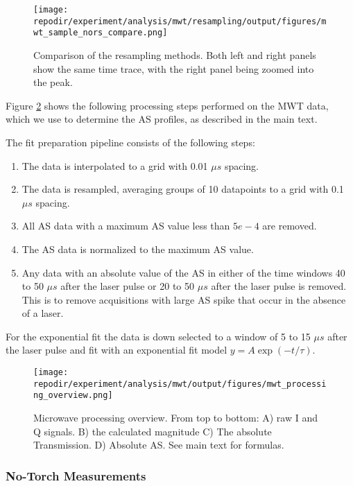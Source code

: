 \begin{figure}
\centering
\texttt{[image: \\repodir/experiment/analysis/mwt/resampling/output/figures/mwt\_sample\_nors\_compare.png]}
\caption{Comparison of the resampling methods. Both left and right panels show the same time trace, with the right panel being zoomed into the peak.}
\label{fig:SI_mwt_resampling}
\end{figure}

Figure \ref{fig:SI_mwt_processing_overview} shows the following processing steps performed on the MWT data, which we use to determine the AS profiles, as described in the main text.

The fit preparation pipeline consists of the following steps:

\begin{enumerate}
    \item The data is interpolated to a grid with 0.01 $\mu s$ spacing.
    \item The data is resampled, averaging groups of 10 datapoints to a grid with 0.1 $\mu s$ spacing. %
    \item All AS data with a maximum AS value less than $5e-4$ are removed.
    \item The AS data is normalized to the maximum AS value.
    \item Any data with an absolute value of the AS in either of the time windows 40 to 50 $\mu s$ after the laser pulse or 20 to 50 $\mu s$ after the laser pulse is removed. This is to remove acquisitions with large AS spike that occur in the absence of a laser.
\end{enumerate}


For the exponential fit the data is down selected to a window of 5 to 15 $\mu s$ after the laser pulse and fit with an exponential fit model $y = A \exp(-t/\tau) $.


\begin{figure}[]
\centering
\texttt{[image: \\repodir/experiment/analysis/mwt/output/figures/mwt\_processing\_overview.png]}
\caption{Microwave processing overview. From top to bottom: A) raw I and Q signals. B) the calculated magnitude C) The absolute Transmission. D) Absolute AS. See main text for formulas.  }
\label{fig:SI_mwt_processing_overview}
\end{figure}


\subsubsection{No-Torch Measurements} %
\label{sec:no_torch_measurements}

